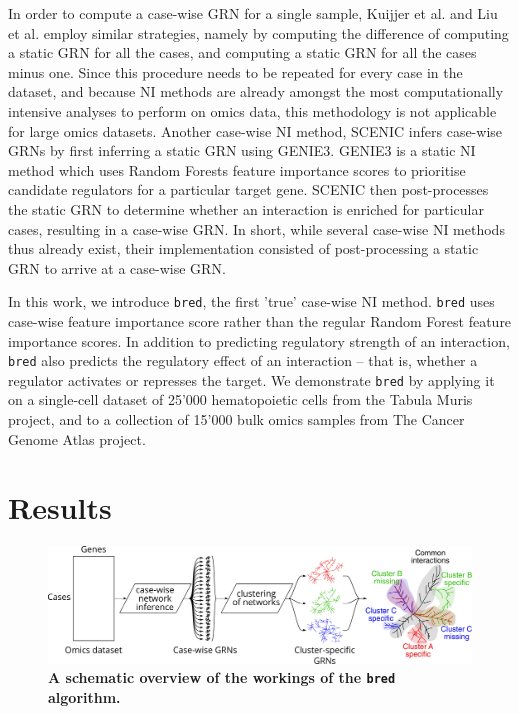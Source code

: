 In order to compute a case-wise GRN for a single sample, Kuijjer et al.\cite{kuijjer_estimatingsamplespecificregulatory_2019} and Liu et al.\cite{liu_personalizedcharacterizationdiseases_2016} employ similar strategies, namely by computing the difference of computing a static GRN for all the cases, and computing a static GRN for all the cases minus one. Since this procedure needs to be repeated for every case in the dataset, and because NI methods are already amongst the most computationally intensive analyses to perform on omics data, this methodology is not applicable for large omics datasets.
Another case-wise NI method, SCENIC\cite{aibar_scenicsinglecellregulatory_2017} infers case-wise GRNs by first inferring a static GRN using GENIE3\cite{huynh-thu_inferringregulatorynetworks_2010}. GENIE3 is a static NI method which uses Random Forests\cite{breiman_randomforests_2001} feature importance scores to prioritise candidate regulators for a particular target gene. SCENIC then post-processes the static GRN to determine whether an interaction is enriched for particular cases, resulting in a case-wise GRN. 
In short, while several case-wise NI methods thus already exist, their implementation consisted of post-processing a static GRN to arrive at a case-wise GRN. 

In this work, we introduce \texttt{bred}, the first 'true' case-wise NI method. 
\texttt{bred} uses case-wise feature importance\cite{xu_casespecificrandomforests_2016} score rather than the regular Random Forest feature importance scores. In addition to predicting regulatory strength of an interaction, \texttt{bred} also predicts the regulatory effect of an interaction -- that is, whether a regulator activates or represses the target.
We demonstrate \texttt{bred} by applying it on a single-cell dataset of 25'000 hematopoietic cells from the Tabula Muris project\cite{schaum_singlecelltranscriptomics20_2018}, and to a collection of 15'000 bulk omics samples from The Cancer Genome Atlas project\cite{weinstein_cancergenomeatlas_2013}.


\section{Results}


\begin{figure}[htb!]
	\centering
	\includegraphics[width=\linewidth]{fig/example.pdf} 
	\caption{
		\textbf{A schematic overview of the workings of the \texttt{bred} algorithm.}
	}
	\label{fig:example_cni}
\end{figure}

